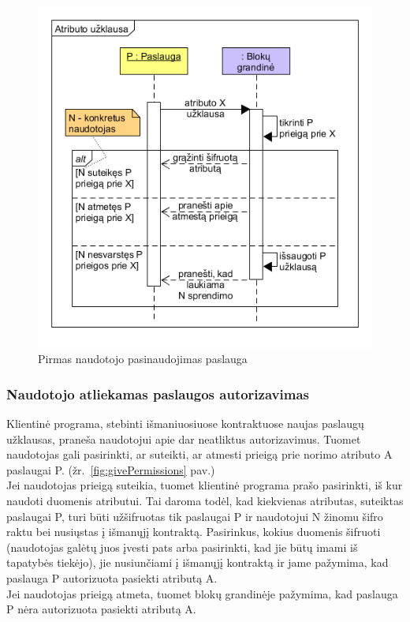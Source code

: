\begin{figure}[h]
    \centering
    \includegraphics[scale=0.7]{img/askForAttributeSequence}
    \caption{Pirmas naudotojo pasinaudojimas paslauga}
    \label{fig:askForAttributeSequence}
\end{figure}

\subsubsection{Naudotojo atliekamas paslaugos autorizavimas}

Klientinė programa, stebinti išmaniuosiuose kontraktuose naujas paslaugų užklausas, praneša naudotojui apie dar
neatliktus autorizavimus. Tuomet naudotojas gali pasirinkti, ar suteikti, ar atmesti prieigą prie norimo atributo
A paslaugai P. (žr.~\ref{fig:givePermissions} pav.)\\
Jei naudotojas prieigą suteikia, tuomet klientinė programa prašo pasirinkti, iš kur naudoti duomenis atributui. Tai
daroma todėl, kad kiekvienas atributas, suteiktas paslaugai P, turi būti užšifruotas tik paslaugai P ir naudotojui N
žinomu šifro raktu bei nusiųstas
į išmanųjį kontraktą. Pasirinkus, kokius duomenis šifruoti (naudotojas galėtų juos įvesti pats arba pasirinkti, kad
jie būtų imami iš tapatybės tiekėjo), jie nusiunčiami į išmanųjį kontraktą ir jame pažymima, kad paslauga P autorizuota
pasiekti atributą A.\\
Jei naudotojas prieigą atmeta, tuomet blokų grandinėje pažymima, kad paslauga P nėra autorizuota pasiekti atributą A.

